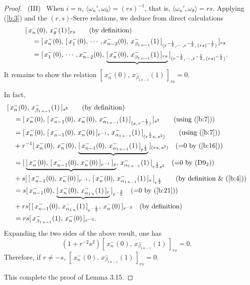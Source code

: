 \documentclass{amsproc}
\theoremstyle{remark}
\numberwithin{equation}{section}
\begin{document}
\begin{proof}
\ (III) \, When $i=n$, $\langle{\omega}_{n}',{\omega}_0\rangle=(rs)^{-1}$,
that is, ${\langle} {\omega}_{n}',{\omega}_\theta{\rangle}=rs$. Applying (\ref{b:3}) and the
$(r,s)$-Serre relations, we deduce from direct calculations
\begin{eqnarray*}
\begin{split}
&[\,x_n^-{(0)},\, x_{\theta}^-(1)\,]_{rs}
\qquad {\hbox{(by definition)}}\\
&\quad=[\,x_n^-(0),\,[\,x_{1}^-(0),\,\cdots, x_{n-2}^-(0),\,
x_{\beta_{1\,n-1}}^-(1)\,]_{(r^{-\frac{1}{2}},\cdots,r^{-\frac{1}{2}}
,\,(rs)^{-\frac{1}{2}})}
\,]_{rs}\\
&\quad=[\,x_{1}^-(0),\,\cdots, x_{n-2}^-(0),\,
\underbrace{[\,x_n^-(0),\,x_{\beta_{1\,n-1}}^-(1)\,]_{rs}}
\,]_{(r^{-\frac{1}{2}},\cdots,r^{-\frac{1}{2}},\,(rs)^{-\frac{1}{2}})}.
\end{split}
\end{eqnarray*}
It remains  to show the relation
$[\,x_n^-(0),\,x_{\beta_{1\,n-1}}^-(1)\,]_{rs}=0$.

In fact,
\begin{eqnarray*}
\begin{split}
&[\,x_n^-{(0)},\, x_{\beta_{1\,n-1}}^-(1)\,]_{s^{2}}
\qquad {\hbox{(by definition)}}\\
&\quad=[\,x_n^-(0),\,[\,x_{n-1}^-(0),\,x_n^-(0),\,x_{\alpha_{1\,n-1}}^-(1)
\,]_{(s,\,r^{-\frac{1}{2}})}\,]_{s^{2}}
\qquad {\hbox{(using (\ref{b:7}))}}\\
&\quad=[\,x_n^-(0),\,[\,x_{n-1}^-(0),\,x_n^-(0)\,]_{r^{-1}}
,\,x_{\alpha_{1\,n-1}}^-(1)\,]_{(r^{\frac{1}{2}}s,\,s^{2})}
\qquad {\hbox{(using (\ref{b:7}))}}\\
&\quad+r^{-1}[\,x_n^-(0),\,x_n^-(0),\,
\underbrace{[\,x_{n-1}^-(0),\,x_{\alpha_{1\,n-1}}^-(1)\,]_{r^{\frac{1}{2}}}}
\,]_{(rs,\,s^{2})}\quad {\hbox{(=0 by (\ref{b:16}))}}\\
&\quad=[\,\underbrace{[\,x_n^-(0),\,[\,x_{n-1}^-(0),\,x_n^-(0)\,]_{r^{-1}}
\,]_{s}}
,\,x_{\alpha_{1\,n-1}}^-(1)\,]_{r^{\frac{1}{2}}s^2}\quad {\hbox{(=0 by (D9$_2$))}}\\
&\quad+s[\,[\,x_{n-1}^-(0),\,x_n^-(0)\,]_{r^{-1}}
,\,[\,x_{n}^-(0),\,x_{\alpha_{1\,n-1}}^-(1)\,]_{s}
\,]_{r^{\frac{1}{2}}}\qquad {\hbox{(by definition \& (\ref{b:4}))}}\\
&\quad=s[\,x_{n-1}^-(0),\,
\underbrace{[\,x_n^-(0),\,x_{\alpha_{1\,n}}^-(1)\,]_{r}}
\,]_{r^{-\frac{3}{2}}}\quad {\hbox{(=0 by (\ref{b:21}))}}\\
&\quad+rs[\,[\,x_{n-1}^-(0),\,x_{\alpha_{1\,n}}^-(1)\,]_{r^{-\frac{1}{2}}}
,\,x_{n}^-(0)\,]_{r^{-2}}
\quad {\hbox{(by definition)}}\\
&\quad=rs[\,x_{\beta_{1\,n-1}}^-(1),\,x_{n}^-(0)\,]_{r^{-2}}.
\end{split}
\end{eqnarray*}
Expanding the two sides of the above result, one has
$$(1+r^{-2}s^{2})[\,x_n^-(0),\, x_{\beta_{1\,n-1}}^-(1)\,]_{rs}=0.$$
Therefore, if $r\ne -s$,
$[\,x_n^-(0),\,x_{\beta_{1\,n-1}}^-(1)\,]_{rs}=0.$

This complete the proof of Lemma 3.15.
\end{proof}
\end{document}

